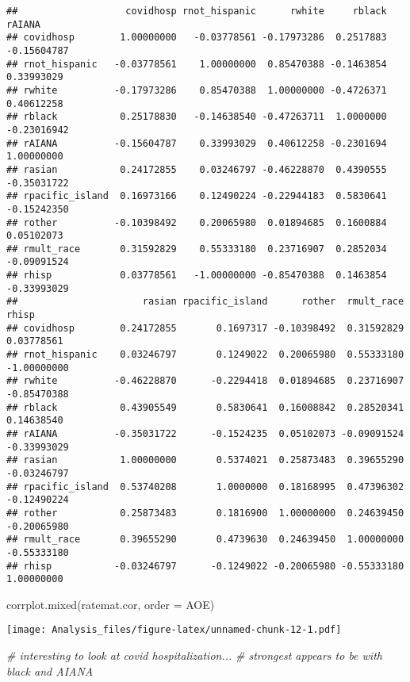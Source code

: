 \documentclass[
]{article}
\newenvironment{Shaded}{\begin{snugshade}}{\end{snugshade}}
\newcommand{\AttributeTok}[1]{\textcolor[rgb]{0.77,0.63,0.00}{#1}}
\newcommand{\CommentTok}[1]{\textcolor[rgb]{0.56,0.35,0.01}{\textit{#1}}}
\newcommand{\FunctionTok}[1]{\textcolor[rgb]{0.00,0.00,0.00}{#1}}
\newcommand{\NormalTok}[1]{#1}
\newcommand{\StringTok}[1]{\textcolor[rgb]{0.31,0.60,0.02}{#1}}
\begin{document}
\begin{verbatim}
##                   covidhosp rnot_hispanic      rwhite     rblack      rAIANA
## covidhosp        1.00000000   -0.03778561 -0.17973286  0.2517883 -0.15604787
## rnot_hispanic   -0.03778561    1.00000000  0.85470388 -0.1463854  0.33993029
## rwhite          -0.17973286    0.85470388  1.00000000 -0.4726371  0.40612258
## rblack           0.25178830   -0.14638540 -0.47263711  1.0000000 -0.23016942
## rAIANA          -0.15604787    0.33993029  0.40612258 -0.2301694  1.00000000
## rasian           0.24172855    0.03246797 -0.46228870  0.4390555 -0.35031722
## rpacific_island  0.16973166    0.12490224 -0.22944183  0.5830641 -0.15242350
## rother          -0.10398492    0.20065980  0.01894685  0.1600884  0.05102073
## rmult_race       0.31592829    0.55333180  0.23716907  0.2852034 -0.09091524
## rhisp            0.03778561   -1.00000000 -0.85470388  0.1463854 -0.33993029
##                      rasian rpacific_island      rother  rmult_race       rhisp
## covidhosp        0.24172855       0.1697317 -0.10398492  0.31592829  0.03778561
## rnot_hispanic    0.03246797       0.1249022  0.20065980  0.55333180 -1.00000000
## rwhite          -0.46228870      -0.2294418  0.01894685  0.23716907 -0.85470388
## rblack           0.43905549       0.5830641  0.16008842  0.28520341  0.14638540
## rAIANA          -0.35031722      -0.1524235  0.05102073 -0.09091524 -0.33993029
## rasian           1.00000000       0.5374021  0.25873483  0.39655290 -0.03246797
## rpacific_island  0.53740208       1.0000000  0.18168995  0.47396302 -0.12490224
## rother           0.25873483       0.1816900  1.00000000  0.24639450 -0.20065980
## rmult_race       0.39655290       0.4739630  0.24639450  1.00000000 -0.55333180
## rhisp           -0.03246797      -0.1249022 -0.20065980 -0.55333180  1.00000000
\end{verbatim}

\begin{Shaded}
\begin{Highlighting}[]
\FunctionTok{corrplot.mixed}\NormalTok{(ratemat.cor, }\AttributeTok{order =} \StringTok{\textquotesingle{}AOE\textquotesingle{}}\NormalTok{)}
\end{Highlighting}
\end{Shaded}

\texttt{[image: Analysis\_files/figure-latex/unnamed-chunk-12-1.pdf]}

\begin{Shaded}
\begin{Highlighting}[]
\CommentTok{\# interesting to look at covid hospitalization...}
\CommentTok{\# strongest appears to be with black and AIANA}
\end{Highlighting}
\end{Shaded}
\end{document}
